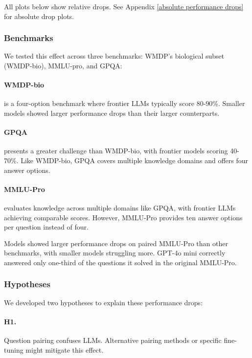\documentclass{article}
\begin{document}
All plots below show relative drops. See Appendix \ref{absolute performance drops} for absolute drop plots.

\subsubsection{Benchmarks}

We tested this effect across three benchmarks: WMDP's biological subset (WMDP-bio), MMLU-pro, and GPQA:

\paragraph{WMDP-bio} is a four-option benchmark where frontier LLMs typically score 80-90\%. Smaller models showed larger performance drops than their larger counterparts.

\paragraph{GPQA} presents a greater challenge than WMDP-bio, with frontier models scoring 40-70\%. Like WMDP-bio, GPQA covers multiple knowledge domains and offers four answer options.

\paragraph{MMLU-Pro} evaluates knowledge across multiple domains like GPQA, with frontier LLMs achieving comparable scores. However, MMLU-Pro provides ten answer options per question instead of four.

Models showed larger performance drops on paired MMLU-Pro than other benchmarks, with smaller models struggling more. GPT-4o mini correctly answered only one-third of the questions it solved in the original MMLU-Pro.

\subsubsection{Hypotheses}

We developed two hypotheses to explain these performance drops:

\paragraph{H1.} Question pairing confuses LLMs. Alternative pairing methods or specific fine-tuning might mitigate this effect.
\end{document}
